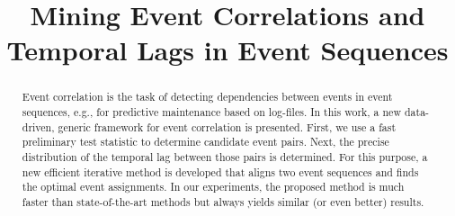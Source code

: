 \documentclass[conference]{IEEEtran}
\theoremstyle{examplestyle}
\begin{document}
\begin{acronym}
\end{acronym}





\title{Mining Event Correlations and Temporal Lags in Event Sequences}


\author{
\and
{}
}
 



\maketitle


\begin{abstract}
Event correlation is the task of detecting dependencies between events in event sequences, e.g., for predictive maintenance based on log-files.
In this work, a new data-driven, generic framework for event correlation is presented. 
First, we use a fast preliminary test statistic to determine candidate event pairs. Next, the precise distribution of the temporal lag between those pairs is determined. 
For this purpose, a new efficient iterative method is developed that aligns two event sequences and finds the optimal event assignments.
In our experiments, the proposed method is much faster than state-of-the-art methods but always yields similar (or even better) results. 
\end{abstract}






\IEEEpeerreviewmaketitle
\end{document}
